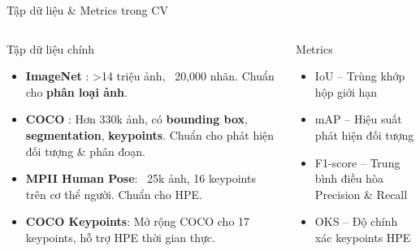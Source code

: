 
\begin{frame}{Tập dữ liệu \& Metrics trong CV}
\begin{columns}[T]

\begin{column}{0.55\textwidth}
\begin{block}{Tập dữ liệu chính}
\begin{itemize}
    \item \textbf{ImageNet} \cite{deng2009imagenet}: >14 triệu ảnh, ~20,000 nhãn. Chuẩn cho \textbf{phân loại ảnh}.
    \item \textbf{COCO} \cite{lin2014microsoft}: Hơn 330k ảnh, có \textbf{bounding box}, \textbf{segmentation}, \textbf{keypoints}. Chuẩn cho phát hiện đối tượng & phân đoạn.
    \item \textbf{MPII Human Pose}: ~25k ảnh, 16 keypoints trên cơ thể người. Chuẩn cho HPE.
    \item \textbf{COCO Keypoints}: Mở rộng COCO cho 17 keypoints, hỗ trợ HPE thời gian thực.
\end{itemize}
\end{block}
\end{column}

\begin{column}{0.45\textwidth}
\begin{block}{Metrics}
\begin{itemize}
    \item IoU – Trùng khớp hộp giới hạn
    \item mAP – Hiệu suất phát hiện đối tượng
    \item F1-score – Trung bình điều hòa Precision & Recall
    \item OKS – Độ chính xác keypoints HPE
\end{itemize}
\end{block}
\end{column}

\end{columns}
\end{frame}
